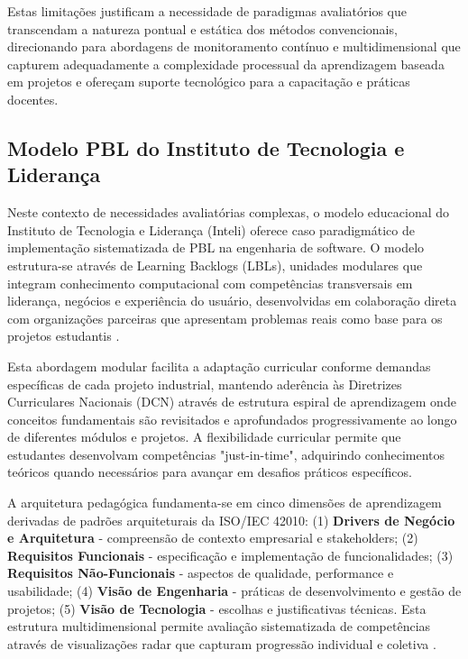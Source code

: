 \documentclass[english, spanish, brazilian]{RBIEarticle} %
\begin{document}
Estas limitações justificam a necessidade de paradigmas avaliatórios que
transcendam a natureza pontual e estática dos métodos convencionais,
direcionando para abordagens de monitoramento contínuo e multidimensional que
capturem adequadamente a complexidade processual da aprendizagem baseada em
projetos e ofereçam suporte tecnológico para a capacitação e práticas docentes.

\subsection{Modelo PBL do Instituto de Tecnologia e Liderança}

Neste contexto de necessidades avaliatórias complexas, o modelo educacional do
Instituto de Tecnologia e Liderança (Inteli) oferece caso paradigmático de
implementação sistematizada de PBL na engenharia de software. O modelo
estrutura-se através de Learning Backlogs (LBLs), unidades modulares que
integram conhecimento computacional com competências transversais em liderança,
negócios e experiência do usuário, desenvolvidas em colaboração direta com
organizações parceiras que apresentam problemas reais como base para os
projetos estudantis \cite{Valente2025}.

Esta abordagem modular facilita a adaptação curricular conforme demandas
específicas de cada projeto industrial, mantendo aderência às Diretrizes
Curriculares Nacionais (DCN) através de estrutura espiral de aprendizagem onde
conceitos fundamentais são revisitados e aprofundados progressivamente ao longo
de diferentes módulos e projetos. A flexibilidade curricular permite que
estudantes desenvolvam competências "just-in-time", adquirindo conhecimentos
teóricos quando necessários para avançar em desafios práticos específicos.

A arquitetura pedagógica fundamenta-se em cinco dimensões de aprendizagem
derivadas de padrões arquiteturais da ISO/IEC 42010: (1) \textbf{Drivers de
  Negócio e Arquitetura} - compreensão de contexto empresarial e stakeholders;
(2) \textbf{Requisitos Funcionais} - especificação e implementação de
funcionalidades; (3) \textbf{Requisitos Não-Funcionais} - aspectos de
qualidade, performance e usabilidade; (4) \textbf{Visão de Engenharia} -
práticas de desenvolvimento e gestão de projetos; (5) \textbf{Visão de
  Tecnologia} - escolhas e justificativas técnicas. Esta estrutura
multidimensional permite avaliação sistematizada de competências através de
visualizações radar que capturam progressão individual e coletiva
\cite{CobengePBL2025}.
\end{document}
